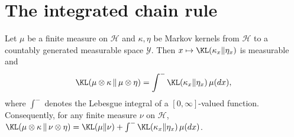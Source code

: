 \section{The integrated chain rule}
\label{sec:pre_info_chain}

\begin{lemma}\label{lem:kl_compProd_kernel}
\leanok
Let $\mu$ be a finite measure on $\mathcal{H}$ and $\kappa,\eta$ be Markov kernels from
$\mathcal{H}$ to a countably generated measurable space $\mathcal{Y}$. Then
$x \mapsto \KL(\kappa_x\|\eta_x)$ is measurable and
\[
  \KL(\mu\otimes\kappa\,\|\,\mu\otimes\eta) = \int^{-} \KL(\kappa_x\|\eta_x)\,\mu(dx) ,
\]
where $\int^-$ denotes the Lebesgue integral of a $[0,\infty]$-valued function. Consequently,
for any finite measure $\nu$ on $\mathcal{H}$,
$\KL(\mu\otimes\kappa\,\|\,\nu\otimes\eta) = \KL(\mu\|\nu) + \int^-\KL(\kappa_x\|\eta_x)\,\mu(dx)$.
\end{lemma}

